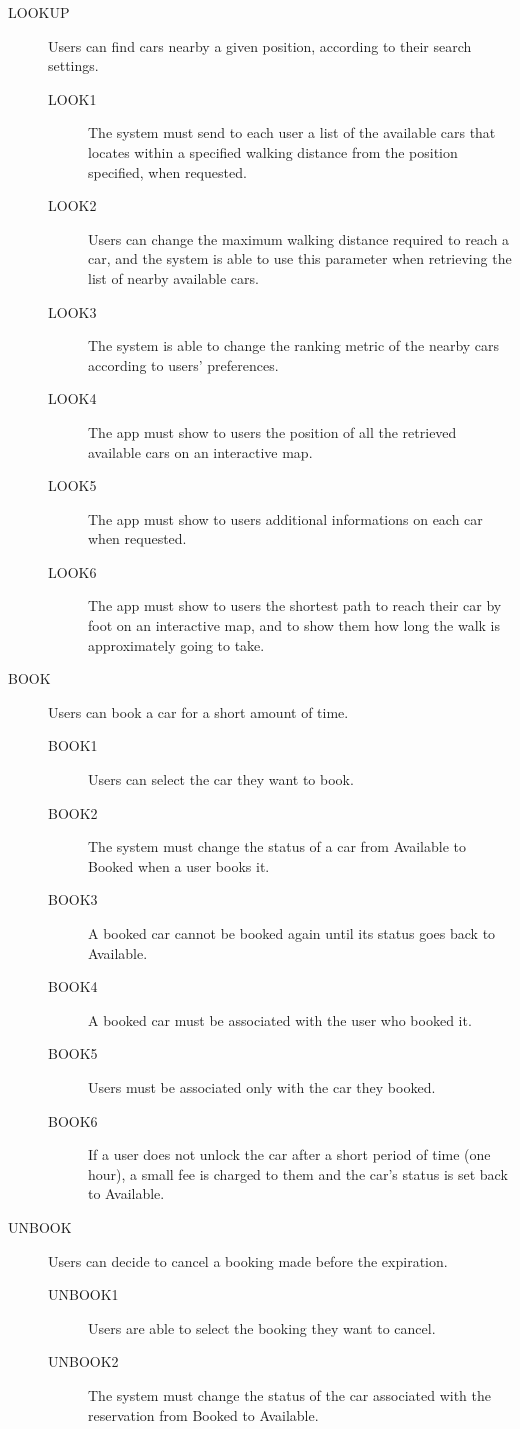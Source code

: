 \documentclass[11pt]{article} %
\begin{document}
\begin{description}
 	\item[LOOKUP] Users can find cars nearby a given position, according to their search settings.
	\begin{description}
	\item[LOOK1] The system must send to each user a list of the available cars that locates within a specified walking distance from the position specified, when requested.
	\item[LOOK2] Users can change the maximum walking distance required to reach a car, and the system is able to use this parameter when retrieving the list of nearby available cars.
	\item[LOOK3] The system is able to change the ranking metric of the nearby cars according to users' preferences.
	\item[LOOK4] The app must show to users the position of all the retrieved available cars on an interactive map.
	\item[LOOK5] The app must show to users additional informations on each car when requested.
	\item[LOOK6] The app must show to users the shortest path to reach their car by foot on an interactive map, and to show them how long the walk is approximately going to take.
	\end{description}

 	\item[BOOK] Users can book a car for a short amount of time.
	\begin{description}
	\item[BOOK1] Users can select the car they want to book.
	\item[BOOK2] The system must change the status of a car from Available to Booked when a user books it.
	\item[BOOK3] A booked car cannot be booked again until its status goes back to Available.
	\item[BOOK4] A booked car must be associated with the user who booked it.
	\item[BOOK5] Users must be associated only with the car they booked.
	\item[BOOK6] If a user does not unlock the car after a short period of time (one hour), a small fee is charged to them and the car's status is set back to Available.
	\end{description}

	\item[UNBOOK] Users can decide to cancel a booking made before the expiration.
	\begin{description}
	\item[UNBOOK1] Users are able to select the booking they want to cancel.
	\item[UNBOOK2] The system must change the status of the car associated with the reservation from Booked to Available.
	\end{description}
	

\end{description}
\end{document}
